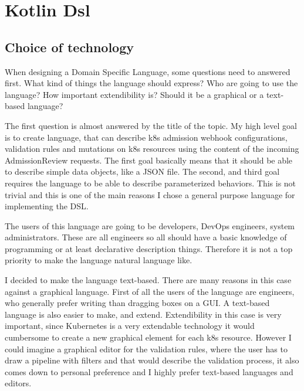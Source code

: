 \setlength{\parindent}{0pt}
\setlength{\parskip}{0.6em}

\chapter{Kotlin Dsl}
\label{sec:dsl}

\section{Choice of technology}

When designing a Domain Specific Language, some questions need to answered first. What kind of things the language should express? Who are going to use the language? How important extendibility is? Should it be a graphical or a text-based language?

The first question is almost answered by the title of the topic. My high level goal is to create language, that can describe k8s admission webhook configurations, validation rules and mutations on k8s resources using the content of the incoming AdmissionReview requests. The first goal basically means that it should be able to describe simple data objects, like a JSON file. The second, and third goal requires the language to be able to describe parameterized behaviors. This is not trivial and this is one of the main reasons I chose a general purpose language for implementing the DSL.

The users of this language are going to be developers, DevOps engineers, system administrators. These are all engineers so all should have a basic knowledge of programming or at least declarative description things. Therefore it is not a top priority to make the language natural language like.

I decided to make the language text-based. There are many reasons in this case against a graphical language. First of all the users of the language are engineers, who generally prefer writing than dragging boxes on a GUI. A text-based language is also easier to make, and extend. Extendibility in this case is very important, since Kubernetes is a very extendable technology it would cumbersome to create a new graphical element for each k8s resource. However I could imagine a graphical editor for the validation rules, where the user has to draw a pipeline with filters and that would describe the validation process, it also comes down to personal preference and I highly prefer text-based languages and editors.

